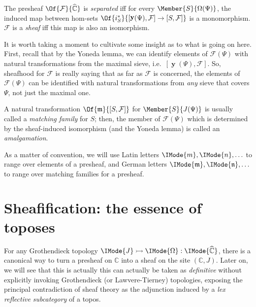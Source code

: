\documentclass{article}
\DeclareMathOperator\OpYoneda{\mathbf{y}}
\newcommand\Yoneda[1]{\OpYoneda({#1})}
\newcommand\Psh[1]{\widehat{#1}}
\newcommand\IsSubobject[3]{\IMode{#1}\rightarrowtail\IMode{#2}:\IMode{#3}}
\begin{document}
\begin{definition}
  The presheaf $\Of{\mathcal{F}}{\Psh{\mathbb{C}}}$ is
  \emph{separated} iff for every
  $\Member{S}{\Omega(\Psi)}$, the induced map
  between hom-sets
  $\Of{i_S^*}{[\Yoneda{\Psi},\mathcal{F}]\to[S,\mathcal{F}]}$ is a
  monomorphism. $\mathcal{F}$ is a \emph{sheaf} iff this map is also
  an isomorphism.
\end{definition}

It is worth taking a moment to cultivate some insight as to what is
going on here. First, recall that by the Yoneda lemma, we can identify
elements of $\mathcal{F}(\Psi)$ with natural transformations from the
maximal sieve, i.e.\ $[\Yoneda{\Psi},\mathcal{F}]$. So, sheafhood for
$\mathcal{F}$ is really saying that as far as $\mathcal{F}$ is
concerned, the elements of $\mathcal{F}(\Psi)$ can be identified with
natural transformations from \emph{any} sieve that covers $\Psi$, not
just the maximal one.

\begin{definition}
  A natural transformation $\Of{\mathfrak{m}}{[S,\mathcal{F}]}$ for
  $\Member{S}{J(\Psi)}$ is usually called a \emph{matching family} for
  $S$; then, the member of $\mathcal{F}(\Psi)$ which is determined by the
  sheaf-induced isomorphism (and the Yoneda lemma) is called an
  \emph{amalgamation}.
\end{definition}

\begin{notation}
  As a matter of convention, we will use Latin letters
  $\IMode{m},\IMode{n},\ldots$ to range over elements of a presheaf,
  and German letters
  $\IMode{\mathfrak{m}},\IMode{\mathfrak{n}},\ldots$ to range over
  matching families for a presheaf.
\end{notation}


\section{Sheafification: the essence of toposes}

For any Grothendieck topology
$\IsSubobject{J}{\Omega}{\Psh{\mathbb{C}}}$, there is a canonical way
to turn a presheaf on $\mathbb{C}$ into a sheaf on the site
$(\mathbb{C},J)$. Later on, we will see that this is actually this can
actually be taken as \emph{definitive} without explicitly invoking
Grothendieck (or Lawvere-Tierney) topologies, exposing the principal
contradiction of sheaf theory as the adjunction induced by a \emph{lex
  reflective subcategory} of a topos.
\end{document}
